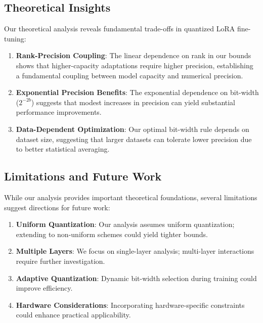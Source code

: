 \documentclass[10pt,twocolumn]{article}
\begin{document}
\subsection{Theoretical Insights}

Our theoretical analysis reveals fundamental trade-offs in quantized LoRA fine-tuning:

\begin{enumerate}
\item \textbf{Rank-Precision Coupling}: The linear dependence on rank in our bounds shows that higher-capacity adaptations require higher precision, establishing a fundamental coupling between model capacity and numerical precision.

\item \textbf{Exponential Precision Benefits}: The exponential dependence on bit-width ($2^{-2b}$) suggests that modest increases in precision can yield substantial performance improvements.

\item \textbf{Data-Dependent Optimization}: Our optimal bit-width rule depends on dataset size, suggesting that larger datasets can tolerate lower precision due to better statistical averaging.
\end{enumerate}

\subsection{Limitations and Future Work}

While our analysis provides important theoretical foundations, several limitations suggest directions for future work:

\begin{enumerate}
\item \textbf{Uniform Quantization}: Our analysis assumes uniform quantization; extending to non-uniform schemes could yield tighter bounds.

\item \textbf{Multiple Layers}: We focus on single-layer analysis; multi-layer interactions require further investigation.

\item \textbf{Adaptive Quantization}: Dynamic bit-width selection during training could improve efficiency.

\item \textbf{Hardware Considerations}: Incorporating hardware-specific constraints could enhance practical applicability.
\end{enumerate}
\end{document}

